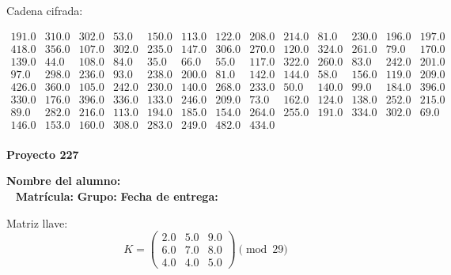 \documentclass[12pt]{article}
\begin{document}
Cadena cifrada:
\begin{center}
$\begin{array}{lllllllllllll}
191.0 & 310.0 & 302.0 & 53.0 & 150.0 & 113.0 & 122.0 & 208.0 & 214.0 & 81.0 & 230.0 & 196.0 & 197.0\\
418.0 & 356.0 & 107.0 & 302.0 & 235.0 & 147.0 & 306.0 & 270.0 & 120.0 & 324.0 & 261.0 & 79.0 & 170.0\\
139.0 & 44.0 & 108.0 & 84.0 & 35.0 & 66.0 & 55.0 & 117.0 & 322.0 & 260.0 & 83.0 & 242.0 & 201.0\\
97.0 & 298.0 & 236.0 & 93.0 & 238.0 & 200.0 & 81.0 & 142.0 & 144.0 & 58.0 & 156.0 & 119.0 & 209.0\\
426.0 & 360.0 & 105.0 & 242.0 & 230.0 & 140.0 & 268.0 & 233.0 & 50.0 & 140.0 & 99.0 & 184.0 & 396.0\\
330.0 & 176.0 & 396.0 & 336.0 & 133.0 & 246.0 & 209.0 & 73.0 & 162.0 & 124.0 & 138.0 & 252.0 & 215.0\\
89.0 & 282.0 & 216.0 & 113.0 & 194.0 & 185.0 & 154.0 & 264.0 & 255.0 & 191.0 & 334.0 & 302.0 & 69.0\\
146.0 & 153.0 & 160.0 & 308.0 & 283.0 & 249.0 & 482.0 & 434.0\\
\end{array}$
\end{center}

\newpage


\textbf{Proyecto 227}

\textbf{Nombre del alumno:} \underline{\hspace{13cm}}\\\
\vspace{1cm}
\textbf{Matrícula:} \underline{\hspace{4cm}} \hspace{1cm}
\textbf{Grupo:} \underline{\hspace{2cm}}
\textbf{Fecha de entrega:} \underline{\hspace{2cm}}

\medskip

Matriz llave:
\[
K = \begin{pmatrix}
2.0 & 5.0 & 9.0\\
6.0 & 7.0 & 8.0\\
4.0 & 4.0 & 5.0
\end{pmatrix} \pmod{29}
\]
\end{document}
